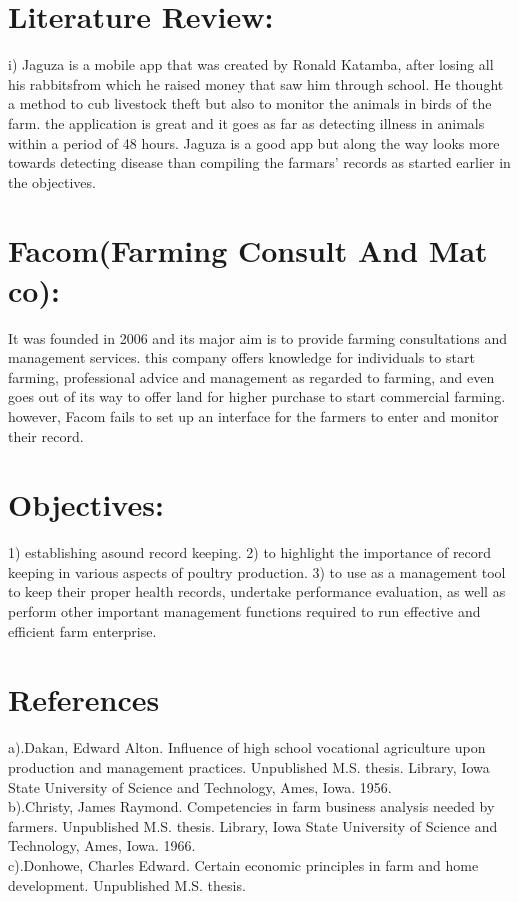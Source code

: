 \documentclass[10pt,letterpaper]{article}
\begin{document}
\section{Literature Review:}
i) Jaguza is a mobile app that was created by Ronald Katamba, after losing all his rabbitsfrom which he raised money that saw him through school. He thought a method to cub livestock theft but also to monitor the animals in birds of the farm.
the application is great and it goes as far as detecting illness in animals within a period of 48 hours.
Jaguza is a good app but along the way looks more towards detecting disease than compiling the farmars' records as started earlier in the objectives.    
\section{Facom(Farming Consult And Mat co):}
It was founded in 2006 and its major aim is to provide farming consultations and management services.
this company offers knowledge for individuals to start farming, professional advice and management as regarded to farming, and even goes out of its way to offer land for higher purchase to start commercial farming.
however, Facom fails to set up an interface for the farmers to enter and monitor their record.
\section{Objectives:}
1) establishing  asound record keeping.
2) to highlight the importance of record keeping in various aspects of poultry production.
3) to use as a management tool to keep their proper health records, undertake performance evaluation, as well as perform other important management functions required to run effective and efficient farm enterprise. 
\section{References}
a).Dakan, Edward Alton. Influence of high school vocational agriculture upon production and management practices. Unpublished M.S. thesis. Library, Iowa State University of Science and Technology, Ames, Iowa. 1956.
\\b).Christy, James Raymond. Competencies in farm business analysis needed by farmers. Unpublished M.S. thesis. Library, Iowa State University of Science and Technology, Ames, Iowa. 1966. 
\\c).Donhowe, Charles Edward. Certain economic principles in farm and home development. Unpublished M.S. thesis. 
\end{document}
